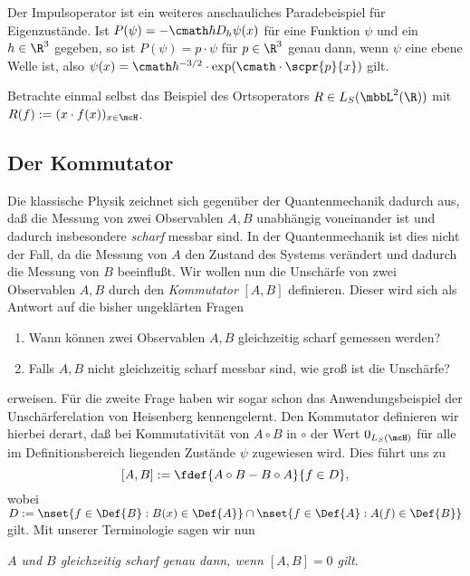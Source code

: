 \documentclass{subfiles}
\begin{document}
        Der Impulsoperator ist ein weiteres anschauliches Paradebeispiel für Eigenzustände. Ist $P(\psi) = -\cmath\hbar D_h\psi(x)$ für eine Funktion $\psi$ und ein $h\in\R^3$ gegeben, so ist $P(\psi) = p\cdot\psi$ für $p\in\R^3$ genau dann, wenn $\psi$ eine ebene Welle ist, also $\psi(x) = \cmath\hbar^{-3/2}\cdot\exp(\cmath\cdot\scpr{p}{x})$ gilt. 
        \begin{Aufgabe}
            \nr{} Betrachte einmal selbst das Beispiel des Ortsoperators $R\in L_S(\mbbL^2(\R))$ mit $R(f):=(x\cdot f(x))_{x\in\mcH}$. 
        \end{Aufgabe}

    \subsection{Der Kommutator}
        Die klassische Physik zeichnet sich gegenüber der Quantenmechanik dadurch aus, daß die Messung von zwei Observablen $A,B$ unabhängig voneinander ist und dadurch insbesondere \emph{scharf} messbar sind. In der Quantenmechanik ist dies nicht der Fall, da die Messung von $A$ den Zustand des Systems verändert und dadurch die Messung von $B$ beeinflußt. Wir wollen nun die Unschärfe von zwei Observablen $A,B$ durch den \emph{Kommutator} $[A,B]$ definieren. Dieser wird sich als Antwort auf die bisher ungeklärten Fragen
        \begin{enumerate}[label=(\roman*)]
            \item Wann können zwei Observablen $A,B$ gleichzeitig scharf gemessen werden?
            \item Falls $A,B$ nicht gleichzeitig scharf messbar sind, wie groß ist die Unschärfe?
        \end{enumerate}
        erweisen. Für die zweite Frage haben wir sogar schon das Anwendungsbeispiel der Unschärferelation von Heisenberg kennengelernt. Den Kommutator definieren wir hierbei derart, daß bei Kommutativität von $A\circ B$ in $\circ$ der Wert $0_{L_S(\mcH)}$ für alle im Definitionsbereich liegenden Zustände $\psi$ zugewiesen wird. Dies führt uns zu 
        \[[A,B]:= \fdef{A\circ B-B\circ A}{f\in D},\]
        wobei $D:=\nset{f\in\Def{B}:B(x)\in\Def{A}}\cap\nset{f\in\Def{A}:A(f)\in\Def{B}}$ gilt. Mit unserer Terminologie sagen wir nun 
        \begin{center}
            \textit{$A$ und $B$ gleichzeitig scharf genau dann, wenn $[A,B]=0$ gilt.}
        \end{center}
\end{document}
